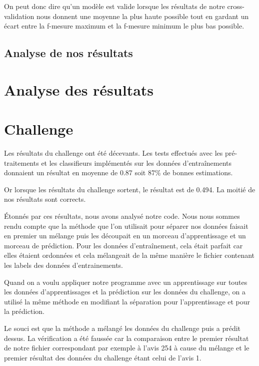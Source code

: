 \documentclass[a4paper]{report}
\begin{document}
            On peut donc dire qu’un modèle est valide lorsque les résultats de notre cross-validation nous donnent une moyenne la plus haute possible tout en gardant un écart entre la f-mesure maximum et la f-mesure minimum le plus bas possible.

        \section{Analyse de nos résultats}



    \chapter{Analyse des résultats}



    \chapter{Challenge}

        Les résultats du challenge ont été décevants. Les tests effectués avec les pré-traitements et les classifieurs implémentés sur les données d'entraînements donnaient un résultat en moyenne de 0.87 soit 87\% de bonnes estimations.

        Or lorsque les résultats du challenge sortent, le résultat est de 0.494. La moitié de nos résultats sont corrects.

        Étonnés par ces résultats, nous avons analysé notre code. Nous nous sommes rendu compte que la méthode que l’on utilisait pour séparer nos données faisait en premier un mélange puis les découpait en un morceau d’apprentissage et un morceau de prédiction. Pour les données d'entraînement, cela était parfait car elles étaient ordonnées et cela mélangeait de la même manière le fichier contenant les labels des données d’entrainements.

        Quand on a voulu appliquer notre programme avec un apprentissage sur toutes les données d’apprentissages et la prédiction sur les données du challenge, on a utilisé la même méthode en modifiant la séparation pour l’apprentissage et pour la prédiction.

        Le souci est que la méthode a mélangé les données du challenge puis a prédit dessus. La vérification a été faussée car la comparaison entre le premier résultat de notre fichier correspondant par exemple à l’avis 254 à cause du mélange et le premier résultat des données du challenge étant celui de l’avis 1.
\end{document}
